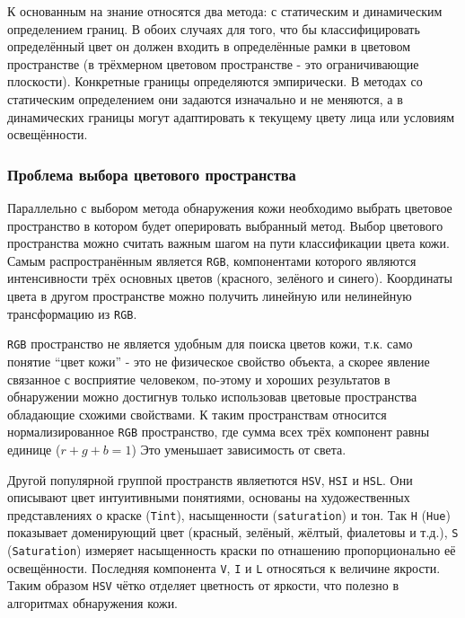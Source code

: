\documentclass[12pt]{report}
\begin{document}
К основанным на знание относятся два метода: с статическим и динамическим определением границ. В обоих случаях для того, что бы классифицировать определённый цвет он должен входить в определённые рамки в цветовом пространстве (в трёхмерном цветовом пространстве - это ограничивающие плоскости). Конкретные границы определяются эмпирически. В методах со статическим определением они задаются изначально и не меняются, а в динамических границы могут адаптировать к текущему цвету лица или условиям освещённости. 

\subsubsection{Проблема выбора цветового пространства}
Параллельно с выбором метода обнаружения кожи необходимо выбрать цветовое пространство в котором будет оперировать выбранный метод. Выбор цветового пространства можно считать важным шагом на пути классификации цвета кожи. Самым распространённым является \texttt{RGB}, компонентами которого являются интенсивности трёх основных цветов (красного, зелёного и синего). Координаты цвета в другом пространстве можно получить линейную или нелинейную трансформацию из \texttt{RGB}. \cite{kakumanu2007survey} 

\texttt{RGB} пространство не является удобным для поиска цветов кожи, т.к. само понятие ``цвет кожи'' - это не физическое свойство объекта, а скорее явление связанное с восприятие человеком, по-этому и хороших результатов в обнаружении можно достигнув только использовав цветовые пространства обладающие схожими свойствами. К таким пространствам относится нормализированное \texttt{RGB} пространство, где сумма всех трёх компонент равны единице ($r+g+b=1$) Это уменьшает зависимость от света. \citep{vezhnevets2003survey}

Другой популярной группой пространств являетются \texttt{HSV}, \texttt{HSI} и \texttt{HSL}. Они описывают цвет интуитивными понятиями, основаны на художественных представлениях о краске (\texttt{Tint}), насыщенности (\texttt{saturation}) и тон. Так \texttt{H} (\texttt{Hue}) показывает доменирующий цвет (красный, зелёный, жёлтый, фиалетовы и т.д.), \texttt{S} (\texttt{Saturation}) измеряет насыщенность краски по отнашению пропорционально её освещённости. Последняя компонента \texttt{V}, \texttt{I} и \texttt{L} относяться к величине якрости. Таким образом \texttt{HSV} чётко отделяет цветность от яркости, что полезно в алгоритмах обнаружения кожи. \citep{vezhnevets2003survey}
\end{document}
